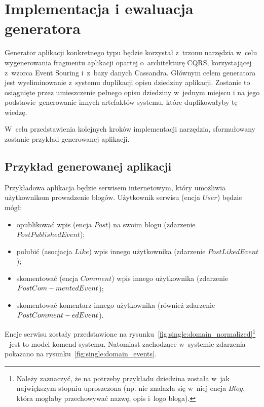 \chapter{Implementacja i ewaluacja generatora} \label{chap:implementation:single_type}

Generator aplikacji konkretnego typu będzie korzystał z~trzonu narzędzia w~celu wygenerowania fragmentu aplikacji opartej o~architekturę CQRS, korzystającej z~wzorca Event Souring i~z~bazy danych Cassandra.
Głównym celem generatora jest wyeliminowanie z~systemu duplikacji opisu dziedziny aplikacji.
Zostanie to osiągnięte przez umieszczenie pełnego opisu dziedziny w~jednym miejscu i na jego podstawie~generowanie innych artefaktów systemu, które duplikowałyby tę wiedzę.

W~celu przedstawienia kolejnych kroków implementacji narzędzia, sformułowany zostanie przykład generowanej aplikacji.



\section{Przykład generowanej aplikacji} \label{sec:sample_app}

Przykładowa aplikacja będzie serwisem internetowym, który umożliwia użytkownikom prowadzenie blogów.
Użytkownik serwisu (encja $User$) będzie mógł:

\begin{itemize}
 \item opublikować wpis (encja $Post$) na swoim blogu (zdarzenie $PostPublishedEvent$);
 \item polubić (asocjacja $Like$) wpis innego użytkownika (zdarzenie $PostLikedEvent$);
 \item skomentować (encja $Comment$) wpis innego użytkownika (zdarzenie $PostCom-\\mentedEvent$);
 \item skomentować komentarz innego użytkownika (również zdarzenie $PostComment-\\edEvent$).
\end{itemize}

Encje serwisu zostały przedstawione na rysunku~\ref{fig:single:domain_normalized}\footnote{Należy zaznaczyć, że na potrzeby przykładu dziedzina została w~jak największym stopniu uproszczona (np. nie znalazła się w~niej encja $Blog$, która mogłaby przechowywać nazwę, opis i~logo bloga).} - jest to model komend systemu.
Natomiast zachodzące w~systemie zdarzenia pokazano na rysunku~\ref{fig:single:domain_events}.

